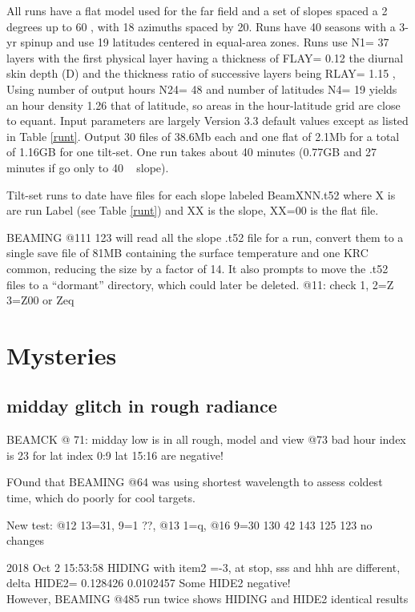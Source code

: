 \documentclass{article}
\begin{document}
 All runs have a flat model used for the far field and a set of slopes spaced a
 2 degrees up to 60 \qd, with 18 azimuths spaced by 20\qd. Runs have 40 seasons
 with a 3-yr spinup and use 19 latitudes centered in equal-area zones. Runs use
 N1= 37 layers with the first physical layer having a thickness of FLAY= 0.12
 the diurnal skin depth (D) and the thickness ratio of successive layers being
 RLAY= 1.15 , Using number of output hours N24= 48 and number of latitudes N4=
 19 yields an hour density 1.26 that of latitude, so areas in the hour-latitude
 grid are close to equant.  Input parameters are largely Version 3.3 default
 values except as listed in Table \ref{runt}. Output 30 files of 38.6Mb each and
 one flat of 2.1Mb for a total of 1.16GB for one tilt-set. One run takes about
 40 minutes (0.77GB and 27 minutes if go only to 40 \qd~ slope).

Tilt-set runs to date have files for each slope labeled BeamXNN.t52 where X is
are run Label (see Table \ref{runt}) and XX is the slope, XX=00 is the flat
file.

BEAMING @111 123 will read all the slope .t52 file for a run, convert them to a
single save file of 81MB containing the surface temperature and one KRC common,
reducing the size by a factor of 14. It also prompts to move the .t52 files to a
``dormant'' directory, which could later be deleted.  
\qi @11: check 1, 2=Z 3=Z00 or Zeq

\section{Mysteries}
\subsection{midday glitch in rough radiance}
BEAMCK @ 71:  midday low is in all rough, model and view
\qi @73  bad hour index is 23 for lat index 0:9   lat 15:16 are negative!

FOund that BEAMING @64 was using shortest wavelength to assess coldest time, which  do poorly for cool targets. 


New test: @12 13=31, 9=1 ??,  @13 1=q,    @16 9=30 
130 42  143  125 123 no changes


2018 Oct 2 15:53:58  HIDING with item2 =-3, at stop, sss and hhh are different, 
\qi delta HIDE2=     0.128426    0.0102457   Some HIDE2 negative!
\\ However, BEAMING @485 run twice shows HIDING and HIDE2  identical results
\end{document}
